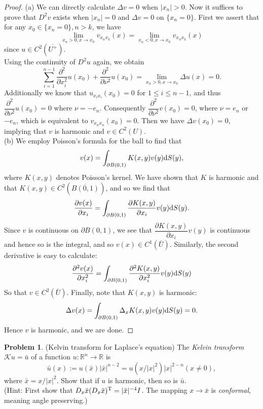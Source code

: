 \documentclass[hyperref,UTF8,12pt]{article}
\numberwithin{equation}{subsection}
\theoremstyle{plain}
\theoremstyle{definition}
\newtheorem{problem}{Problem}
\numberwithin{theorem}{section}
\numberwithin{lemma}{section}
\numberwithin{proposition}{section}
\numberwithin{remark}{section}
\numberwithin{corollary}{section}
\numberwithin{definition}{section}
\numberwithin{problem}{section}
\numberwithin{example}{section}
\def\dif{\textup{d}}
\def\T{\textup{T}}
\newcommand{\ptl}{\partial}
\newcommand{\mr}{\mathbb{R}}
\renewcommand{\leq}{\leqslant}
\begin{document}
\begin{proof}
(a) We can directly calculate $\Delta v=0$ when $|x_n|>0$. Now it suffices to prove that $D^2v$ exists when $|x_n|=0$ and $\Delta v=0$ on $\{x_n=0\}$. First we assert that for any $x_0\in\{x_n=0\},n>k$, we have\[\lim_{x_n>0,x\to x_0}v_{x_nx_k}(x)= \lim_{x_n<0,x\to x_0}v_{x_nx_k}(x)\]since $u \in C^2(\overline{U^+})$.\\
Using the continuity of $D^2u$ again, we obtain\[\sum_{i=1}^{n-1}\frac{\ptl^2}{\ptl x_i^2}u(x_0)+\frac{\ptl^2}{\ptl\nu^2}u(x_0)=\lim _{x_n>0,x\to x_0}\Delta u(x)=0.\] Additionally we know that $u_{x_ix_i}(x_0)=0$ for $1\leq i\leq n-1$, and thus $\dfrac{\ptl^2}{\ptl\nu^2}u(x_0)=0$ where $\nu=-e_n$. Consequently $\dfrac{\ptl^2}{\ptl\nu^2}v(x_0)=0$, where $\nu=e_n$ or $-e_n$, which is equivalent to $v_{x_nx_n}(x_0)=0$. Then we have $\Delta v(x_0)=0$, implying that $v$ is harmonic and $v\in C^2(U)$.\\
(b) We employ Poisson's formula for the ball to find that
\[v(x)=\int_{\ptl B(0,1)}K(x,y)v(y)\dif S(y),\]where $K(x,y)$ denotes Poisson's kernel. We have shown that $K$ is harmonic and that $K(x,y)\in C^2(\overline{B(0,1)})$, and so we find that\[\frac{\ptl v(x)}{\ptl x_i}=\int_{\ptl B(0,1)}\frac{\ptl K(x, y)}{\ptl x_i}v(y)\dif S(y).\]Since $v$ is continuous on $\ptl B(0,1)$, we see that $\dfrac{\ptl K(x,y)}{\ptl x_i}v(y)$ is continuous and hence so is the integral, and so $v(x)\in C^1(\bar{U})$.  Similarly, the second derivative is easy to calculate:\[
\frac{\ptl^2 v(x)}{\ptl x_i^2}=\int_{\ptl B(0,1)}\frac{\ptl^2K(x,y)}{\ptl x_i^2}v(y)\dif S(y)\]So that $v\in C^2(\bar{U})$. Finally, note that $K(x,y)$ is harmonic:
\[\Delta v(x)=\int_{\ptl B(0,1)}\Delta_xK(x,y)v(y)\dif S(y)=0.\]
Hence $v$ is harmonic, and we are done.
\end{proof}
\begin{problem}
(Kelvin transform for Laplace's equation) The \textit{Kelvin transform} $\mathcal{K}u=\bar{u}$ of a function $u:\mr^n\to\mr$ is
\[\bar{u}(x):=u(\bar{x})|\bar{x}|^{n-2}=u(x/|x|^2)|x|^{2-n}(x\neq 0),\]
where $\bar{x}=x/|x|^2$. Show that if $u$ is harmonic, then so is $\bar{u}$.\\
(Hint: First show that $D_x\bar{x}(D_x\bar{x})^\T=|\bar{x}|^{-4}I$. The mapping $x\to\bar{x}$ is \textit{conformal}, meaning angle preserving.)
\end{problem}
\end{document}
